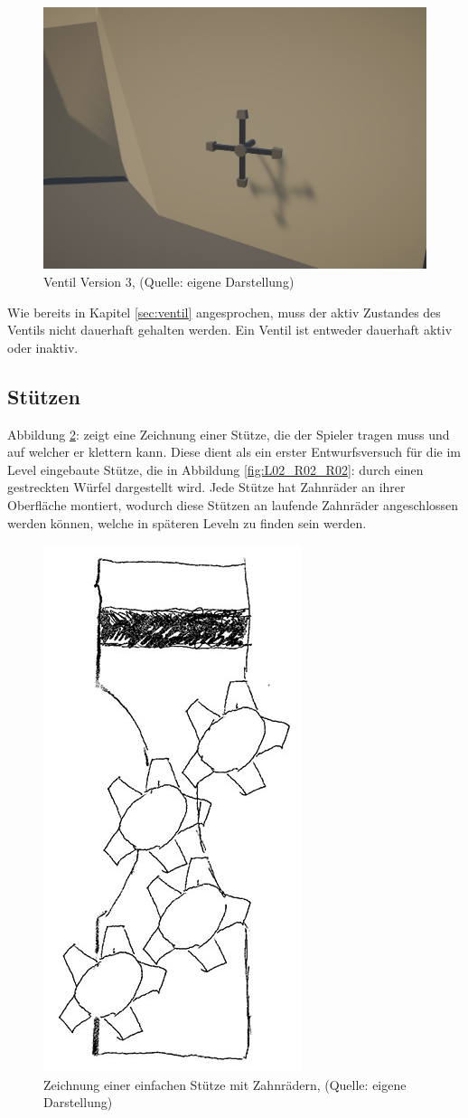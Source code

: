\begin{figure}[ht]
\centering
\includegraphics[width=0.8\linewidth]{content/pictures/Vault_03.jpg}
\caption{Ventil Version 3, (Quelle: eigene Darstellung)}
\label{fig:valve_03}
\end{figure}

Wie bereits in Kapitel \ref{sec:ventil}  angesprochen, muss der aktiv Zustandes des Ventils nicht dauerhaft gehalten werden. Ein Ventil ist entweder dauerhaft aktiv oder inaktiv.

\subsection{Stützen}
Abbildung \ref{fig:stuetze_01}:  zeigt eine Zeichnung einer Stütze, die der Spieler tragen muss und auf welcher er klettern kann. Diese dient als ein erster Entwurfsversuch für die im Level eingebaute Stütze, die in Abbildung \ref{fig:L02_R02_R02}:  durch einen gestreckten Würfel dargestellt wird. Jede Stütze hat Zahnräder an ihrer Oberfläche montiert, wodurch diese Stützen an laufende Zahnräder angeschlossen werden können, welche in späteren Leveln zu finden sein werden.
\begin{figure}[ht]
\centering
\includegraphics[width=0.2\linewidth]{content/pictures/Stuetze_01.jpg}
\caption{Zeichnung einer einfachen Stütze mit Zahnrädern, (Quelle: eigene Darstellung)}
\label{fig:stuetze_01}
\end{figure}

